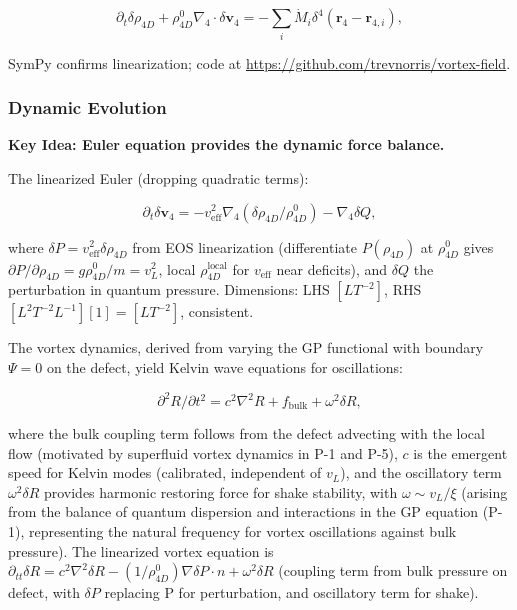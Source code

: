 \begin{equation}
\partial_t \delta \rho_{4D} + \rho_{4D}^0 \nabla_4 \cdot \delta \mathbf{v}_4 = -\sum_i \dot{M}_i \delta^4(\mathbf{r}_4 - \mathbf{r}_{4,i}),
\end{equation}

SymPy confirms linearization; code at \url{https://github.com/trevnorris/vortex-field}.

\subsubsection{Dynamic Evolution}

\textbf{Key Idea: Euler equation provides the dynamic force balance.}

The linearized Euler (dropping quadratic terms):

\begin{equation}
\partial_t \delta \mathbf{v}_4 = -v_{\text{eff}}^2 \nabla_4 (\delta \rho_{4D} / \rho_{4D}^0) - \nabla_4 \delta Q,
\end{equation}

where $\delta P = v_{\text{eff}}^2 \delta \rho_{4D}$ from EOS linearization (differentiate $P(\rho_{4D})$ at $\rho_{4D}^0$ gives $\partial P / \partial \rho_{4D} = g \rho_{4D}^0 / m = v_L^2$, local $\rho_{4D}^{\text{local}}$ for $v_{\text{eff}}$ near deficits), and $\delta Q$ the perturbation in quantum pressure. Dimensions: LHS $[L T^{-2}]$, RHS $[L^2 T^{-2} L^{-1}] [1] = [L T^{-2}]$, consistent.

The vortex dynamics, derived from varying the GP functional with boundary $\Psi=0$ on the defect, yield Kelvin wave equations for oscillations:

\begin{equation}
\partial^2 R / \partial t^2 = c^2 \nabla^2 R + f_{\text{bulk}} + \omega^2 \delta R,
\end{equation}

where the bulk coupling term follows from the defect advecting with the local flow (motivated by superfluid vortex dynamics in P-1 and P-5), $c$ is the emergent speed for Kelvin modes (calibrated, independent of $v_L$), and the oscillatory term $\omega^2 \delta R$ provides harmonic restoring force for shake stability, with $\omega \sim v_L / \xi$ (arising from the balance of quantum dispersion and interactions in the GP equation (P-1), representing the natural frequency for vortex oscillations against bulk pressure). The linearized vortex equation is $\partial_{tt} \delta R = c^2 \nabla^2 \delta R - (1 / \rho_{4D}^0) \nabla \delta P \cdot n + \omega^2 \delta R$ (coupling term from bulk pressure on defect, with $\delta P$ replacing P for perturbation, and oscillatory term for shake).

